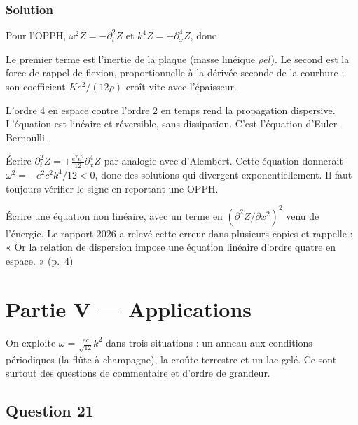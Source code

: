 \documentclass[11pt,a4paper]{article}
\newcommand{\equationajustee}[1]{%
  \sbox{\boiteequation}{$\displaystyle #1$}%
  \ifdim\wd\boiteequation>\linewidth
    \[\resizebox{\linewidth}{!}{\usebox{\boiteequation}}\]%
  \else
    \[#1\]%
  \fi}
\begin{document}
\hypertarget{solution-19}{%
\subsubsection{Solution}\label{solution-19}}

Pour l'OPPH, \(\omega^2Z=-\partial_t^2Z\) et \(k^4Z=+\partial_x^4Z\), donc

\equationajustee{\boxed{\frac{\partial^2Z}{\partial t^2}+\frac{e^2c^2}{12}\frac{\partial^4Z}{\partial x^4}=0}}

Le premier terme est l'inertie de la plaque (masse linéique \(\rho el\)). Le second est la force de rappel de flexion, proportionnelle à la dérivée seconde de la courbure ; son coefficient \(Ke^2/(12\rho)\) croît vite avec l'épaisseur.

L'ordre 4 en espace contre l'ordre 2 en temps rend la propagation dispersive. L'équation est linéaire et réversible, sans dissipation. C'est l'équation d'Euler--Bernoulli.

\begin{piege}

Écrire \(\partial_t^2Z=+\frac{e^2c^2}{12}\partial_x^4Z\) par analogie avec d'Alembert. Cette équation donnerait \(\omega^2=-e^2c^2k^4/12<0\), donc des solutions qui divergent exponentiellement. Il faut toujours vérifier le signe en reportant une OPPH.

\end{piege}

\begin{piege}

Écrire une équation non linéaire, avec un terme en \((\partial^2Z/\partial x^2)^2\) venu de l'énergie. Le rapport 2026 a relevé cette erreur dans plusieurs copies et rappelle : « Or la relation de dispersion impose une équation linéaire d'ordre quatre en espace. » (p.~4)

\end{piege}

\hypertarget{partie-v-applications}{%
\section{Partie V --- Applications}\label{partie-v-applications}}

On exploite \(\omega=\frac{ec}{\sqrt{12}}k^2\) dans trois situations : un anneau aux conditions périodiques (la flûte à champagne), la croûte terrestre et un lac gelé. Ce sont surtout des questions de commentaire et d'ordre de grandeur.

\hypertarget{question-21}{%
\subsection{Question 21}\label{question-21}}
\end{document}
